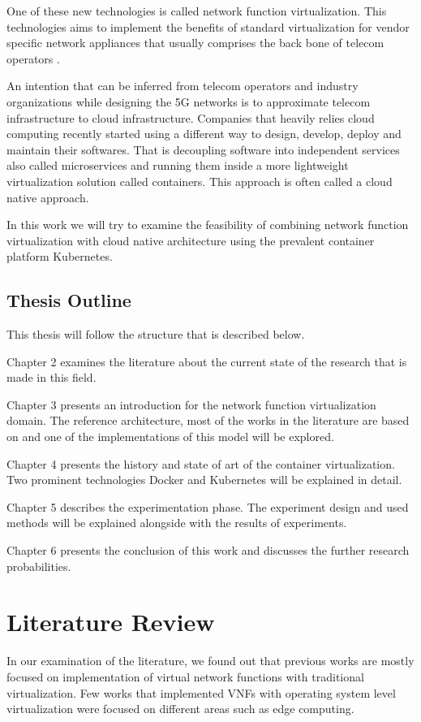 \documentclass[12pt,oneandhalf,chaparabic,ceng,ms,eng,oneside,pntc]{gsufbe}
\begin{document}
One of these new technologies is called network function virtualization. This technologies aims to
implement the benefits of standard virtualization for vendor specific network appliances that usually
comprises the back bone of telecom operators \cite{abdelwahab_network_2016}.

An intention that can be inferred from telecom operators and industry organizations while designing the
5G networks is to approximate telecom infrastructure to cloud infrastructure. Companies that heavily
relies cloud computing recently started using a different way to design, develop, deploy and maintain
their softwares. That is decoupling software into independent services also called microservices and
running them inside a more lightweight virtualization solution called containers. This approach is 
often called a cloud native approach.

In this work we will try to examine the feasibility of combining network function virtualization with
cloud native architecture using the prevalent container platform Kubernetes.

\section{Thesis Outline}
This thesis will follow the structure that is described below.

Chapter 2 examines the literature about the current state of the research that is made in this field. 

Chapter 3 presents an introduction for the network function virtualization domain. The reference
architecture, most of the works in the literature are based on and one of the implementations of this
model will be explored.

Chapter 4 presents the history and state of art of the container virtualization. Two prominent
technologies Docker and Kubernetes will be explained in detail.

Chapter 5 describes the experimentation phase. The experiment design and used methods will be explained
alongside with the results of experiments.

Chapter 6 presents the conclusion of this work and discusses the further research probabilities.

\chapter{Literature Review}
In our examination of the literature, we found out that previous works are mostly focused on
implementation of virtual network functions with traditional virtualization. Few works that implemented
VNFs with operating system level virtualization were focused on different areas such as edge 
computing.
\end{document}
